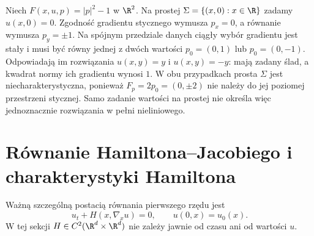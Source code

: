 \begin{przyklad}
Niech $F(x,u,p)=|p|^2-1$ w $\R^2$.
Na prostej $\Sigma=\{(x,0):x\in\R\}$ zadamy
$u(x,0)=0$. Zgodność gradientu stycznego wymusza
$p_x=0$, a równanie wymusza $p_y=\pm1$.
Na spójnym przedziale danych ciągły wybór gradientu
jest stały i musi być równy jednej z dwóch wartości
$p_0=(0,1)$ lub $p_0=(0,-1)$.
Odpowiadają im rozwiązania $u(x,y)=y$ i $u(x,y)=-y$:
mają zadany ślad, a kwadrat normy ich gradientu wynosi $1$.
W obu przypadkach prosta $\Sigma$ jest
niecharakterystyczna, ponieważ $F_p=2p_0=(0,\pm2)$
nie należy do jej poziomej przestrzeni stycznej. Samo zadanie wartości na prostej nie określa
więc jednoznacznie rozwiązania w pełni nieliniowego.
\end{przyklad}

\section{Równanie Hamiltona--Jacobiego i charakterystyki Hamiltona}
\label{sec:pde2-hj}

Ważną szczególną postacią równania pierwszego rzędu jest
\begin{equation}\label{eq:pde2-hj}
 u_t+H(x,\nabla_xu)=0,
 \qquad u(0,x)=u_0(x).
\end{equation}
W tej sekcji $H\in C^2(\R^d\times\R^d)$ nie zależy
jawnie od czasu ani od wartości $u$.

